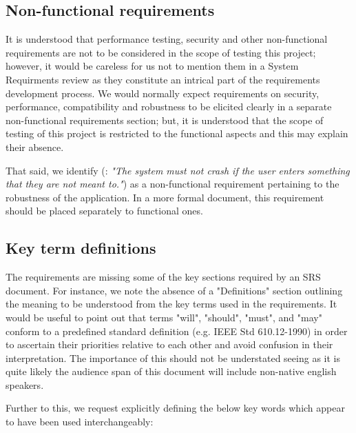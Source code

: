 \subsection{Non-functional requirements}
\label{sec:non-functional-requirements}
It is understood that performance testing, security and other non-functional requirements are not to be considered in the scope of testing this project; however, it would be careless for us not to mention them in a System Requirments review as they constitute an intrical part of the requirements development process. 
We would normally expect requirements on security, performance, compatibility and robustness to be elicited clearly in a separate non-functional requirements section; but, it is understood that the scope of testing of this project is restricted to the functional aspects and this may explain their absence. 
\par
That said, we identify (\RSeven: \textit{"The system must not crash if the user enters something that they are not meant to."}) as a non-functional requirement pertaining to the robustness of the application. In a more formal document, this requirement should be placed separately to functional ones.    
%
\par

\subsection{Key term definitions}
\label{sec:key-term-definitions}
The requirements are missing some of the key sections required by an SRS document.
For instance, we note the absence of a "Definitions" section outlining the meaning to be understood from the key terms used in the requirements.
It would be useful to point out that terms "will", "should", "must", and "may" conform to a predefined standard definition (e.g. IEEE Std 610.12-1990) in order to ascertain their priorities relative to each other and avoid confusion in their interpretation. 
The importance of this should not be understated seeing as it is quite likely the audience span of this document will include non-native english speakers. 
\par
Further to this, we request explicitly defining the below key words which  appear to have been used interchangeably:  


